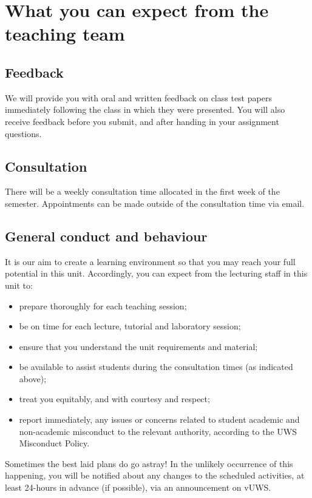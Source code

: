 \documentclass[a4paper,oneside]{book}
\newcommand{\vuws}{vUWS}
\begin{document}
\section{What you can expect from the teaching team}

\subsection*{Feedback}

We will provide you with oral and written feedback on class test papers
immediately following the class in which they were presented.  You
will also receive feedback before you submit, and after handing in
your assignment questions.

\subsection*{Consultation}

There will be a weekly consultation time allocated in the first week
of the semester. Appointments can be made outside of the consultation
time via email.


\subsection*{General conduct and behaviour}

It is our aim to create a learning environment so that you may
reach your full potential in this unit.  Accordingly, you can expect
from the lecturing staff in this unit to:
\begin{itemize}
\item prepare thoroughly for each teaching session;
\item be on time for each lecture, tutorial and laboratory session;
\item ensure that you understand the unit requirements and material;
\item be available to assist students during the consultation times
  (as indicated above);
\item treat you equitably, and with courtesy and respect;
\item report immediately, any issues or concerns related to student
  academic and non-academic misconduct to the relevant authority,
  according to the UWS Misconduct Policy.
\end{itemize}
Sometimes the best laid plans do go astray!  In the unlikely
occurrence of this happening, you will be notified about any changes
to the scheduled activities, at least 24-hours in advance (if
possible), via an announcement on \vuws.
\end{document}
